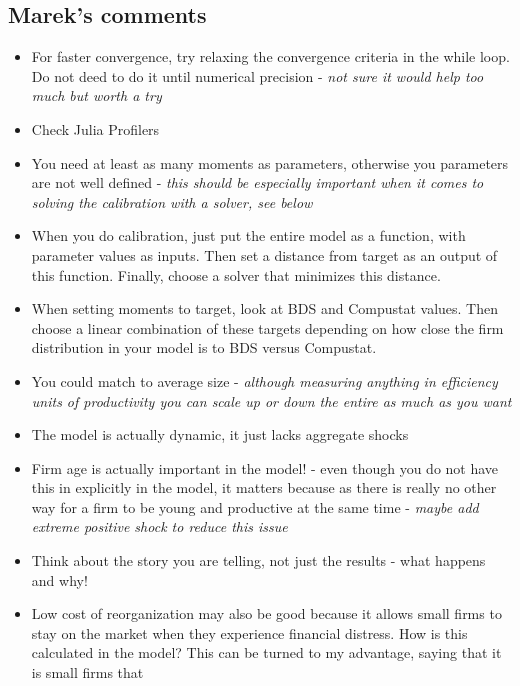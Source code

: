 \documentclass[12pt]{article}
\begin{document}
\subsection*{Marek's comments}
\begin{itemize}\setlength\itemsep{0em} \small
    \item For faster convergence, try relaxing the convergence criteria in the while loop. Do not deed to do it until numerical precision - \textit{not sure it would help too much but worth a try}
    \item Check Julia Profilers 
    \item You need at least as many moments as parameters, otherwise you parameters are not well defined - \textit{this should be especially important when it comes to solving the calibration with a solver, see below}
    \item When you do calibration, just put the entire model as a function, with parameter values as inputs. Then set a distance from target as an output of this function. Finally, choose a solver that minimizes this distance. 
    \item When setting moments to target, look at BDS and Compustat values. Then choose a linear combination of these targets depending on how close the firm distribution in your model is to BDS versus Compustat. 
    \item You could match to average size - \textit{although measuring anything in efficiency units of productivity you can scale up or down the entire as much as you want}
    \item The model is actually dynamic, it just lacks aggregate shocks 
    \item Firm age is actually important in the model! - even though you do not have this in explicitly in the model, it matters because as there is really no other way for a firm to be young and productive at the same time - \textit{maybe add extreme positive shock to reduce this issue}
    \item Think about the story you are telling, not just the results - what happens and why!
    \item Low cost of reorganization may also be good because it allows small firms to stay on the market when they experience financial distress. How is this calculated in the model? This can be turned to my advantage, saying that it is small firms that 
\end{itemize} \normalsize
\end{document}
